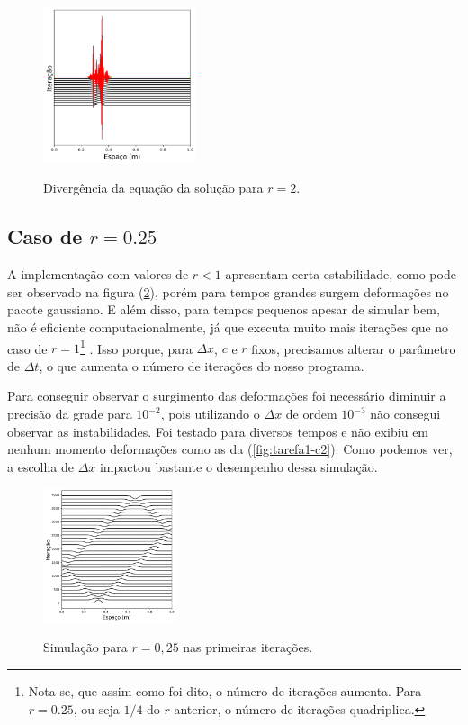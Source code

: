 \documentclass[a4paper, 11pt]{article}
\begin{document}
\begin{figure}[h!] 
    \centering
    \caption{Divergência da equação da solução para \( r = 2 \).
    }
    \includegraphics[width=0.4\textwidth]{graf-tarefa1-b}
    \label{fig:tarefa1-b}
\end{figure}

\clearpage
\subsection{Caso de \( r = 0.25 \) }

A implementação com valores de \( r < 1 \) apresentam certa estabilidade, como pode ser observado
na figura (\ref{fig:tarefa1-c1}), porém para tempos grandes surgem deformações no
pacote gaussiano. E além disso, para tempos pequenos apesar de simular bem, não é eficiente
computacionalmente, já que executa muito mais iterações que no caso de \( r = 1 \)\footnote{Nota-se, que assim como
        foi dito, o número de iterações aumenta.  Para \( r = 0.25 \), ou seja \( 1/4 \) do \( r \) anterior, o número de iterações quadriplica.}
. Isso porque, para
\( \Delta x \), \( c \) e \( r \) fixos, precisamos alterar o parâmetro de \( \Delta t \), o que aumenta
o número de iterações do nosso programa.

Para conseguir observar o surgimento das deformações foi necessário diminuir a precisão da grade
para \( 10^{-2} \), pois utilizando o \( \Delta x \) de ordem \( 10^{-3} \) não consegui observar as
instabilidades. Foi testado para diversos tempos e não exibiu em nenhum momento deformações como as
da (\ref{fig:tarefa1-c2}). Como podemos ver, a escolha de \( \Delta x\) impactou bastante o desempenho
dessa simulação.

\begin{figure}[h!] 
    \centering
    \caption{Simulação para \( r = 0,25 \) nas primeiras iterações.}
    \includegraphics[width=0.35\textwidth]{graf-tarefa1-c1}
    \label{fig:tarefa1-c1}
\end{figure}
\end{document}
